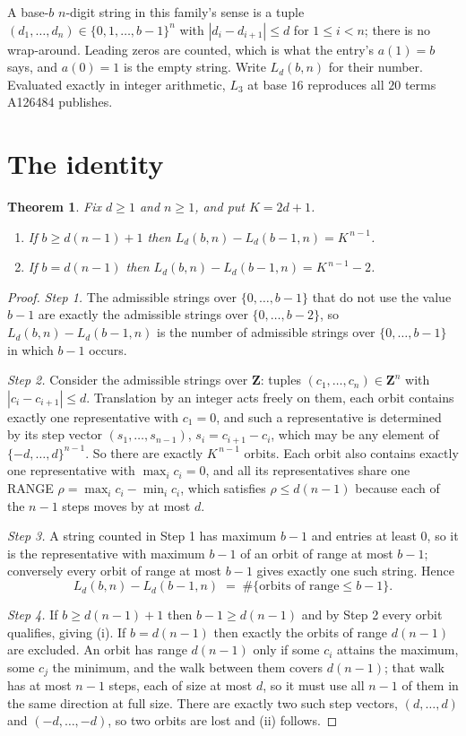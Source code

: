 \documentclass[11pt,a4paper]{article}
\theoremstyle{plain}
\newtheorem{theorem}{Theorem}
\theoremstyle{definition}
\begin{document}
A base-$b$ $n$-digit string in this family's sense is a tuple
$(d_1,\dots,d_n)\in\{0,1,\dots,b-1\}^{n}$ with $|d_i-d_{i+1}|\le d$ for $1\le i<n$; there
is no wrap-around. Leading zeros are counted, which is what the entry's $a(1)=b$ says, and
$a(0)=1$ is the empty string. Write $L_d(b,n)$ for their number. Evaluated exactly in integer
arithmetic, $L_{3}$ at base $16$ reproduces all $20$ terms A126484 publishes.

\section{The identity}

\begin{theorem}
Fix $d\ge1$ and $n\ge1$, and put $K=2d+1$.
\begin{enumerate}
\item[(i)] If $b\ge d(n-1)+1$ then $L_d(b,n)-L_d(b-1,n)=K^{\,n-1}$.
\item[(ii)] If $b=d(n-1)$ then $L_d(b,n)-L_d(b-1,n)=K^{\,n-1}-2$.
\end{enumerate}
\end{theorem}

\begin{proof}
\emph{Step 1.} The admissible strings over $\{0,\dots,b-1\}$ that do not use the value $b-1$
are exactly the admissible strings over $\{0,\dots,b-2\}$, so $L_d(b,n)-L_d(b-1,n)$ is the
number of admissible strings over $\{0,\dots,b-1\}$ in which $b-1$ occurs.

\emph{Step 2.} Consider the admissible strings over $\mathbf{Z}$: tuples
$(c_1,\dots,c_n)\in\mathbf{Z}^{n}$ with $|c_i-c_{i+1}|\le d$. Translation by an integer acts
freely on them, each orbit contains exactly one representative with $c_1=0$, and such a
representative is determined by its step vector $(s_1,\dots,s_{n-1})$, $s_i=c_{i+1}-c_i$,
which may be any element of $\{-d,\dots,d\}^{n-1}$. So there are exactly $K^{\,n-1}$ orbits.
Each orbit also contains exactly one representative with $\max_i c_i=0$, and all its
representatives share one RANGE $\rho=\max_ic_i-\min_ic_i$, which satisfies
$\rho\le d(n-1)$ because each of the $n-1$ steps moves by at most $d$.

\emph{Step 3.} A string counted in Step 1 has maximum $b-1$ and entries at least $0$, so it is
the representative with maximum $b-1$ of an orbit of range at most $b-1$; conversely every orbit
of range at most $b-1$ gives exactly one such string. Hence
\[
L_d(b,n)-L_d(b-1,n)\;=\;\#\{\text{orbits of range}\le b-1\} .
\]

\emph{Step 4.} If $b\ge d(n-1)+1$ then $b-1\ge d(n-1)$ and by Step 2 every orbit qualifies,
giving (i). If $b=d(n-1)$ then exactly the orbits of range $d(n-1)$ are excluded. An orbit has
range $d(n-1)$ only if some $c_i$ attains the maximum, some $c_j$ the minimum, and the walk
between them covers $d(n-1)$; that walk has at most $n-1$ steps, each of size at most $d$, so it
must use all $n-1$ of them in the same direction at full size. There are exactly two such step
vectors, $(d,\dots,d)$ and $(-d,\dots,-d)$, so two orbits are lost and (ii) follows.
\end{proof}
\end{document}

